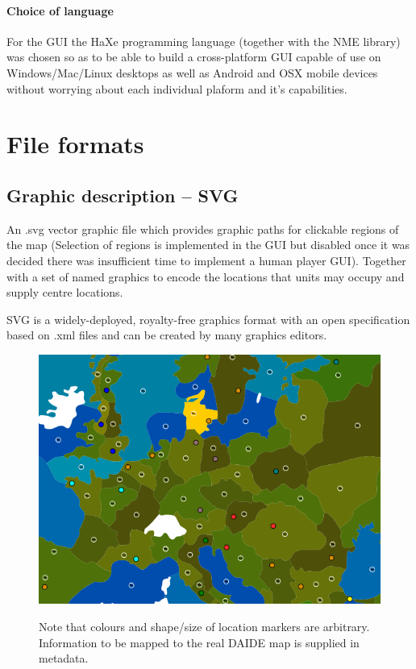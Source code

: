 \paragraph{Choice of language}
For the GUI the HaXe programming language (together with the NME
library) was chosen so as to be able to build a cross-platform GUI
capable of use on Windows/Mac/Linux desktops as well as Android and
OSX mobile devices without worrying about each individual plaform and
it's capabilities.

\section{File formats}

\subsection{Graphic description -- SVG}

An .svg vector graphic file which provides graphic paths for clickable
regions of the map (Selection of regions is implemented in the GUI but
disabled once it was decided there was insufficient time to implement
a human player GUI). Together with a set of named graphics to encode
the locations that units may occupy and supply centre locations.

SVG is a widely-deployed, royalty-free graphics format with an open
specification based on .xml files and can be created by many graphics
editors.

\begin{figure}

\includegraphics[scale=0.5]{./gui/SVG.png}

Note that colours and shape/size of location markers are
arbitrary. Information to be mapped to the real DAIDE map is supplied
in metadata.

\end{figure}

